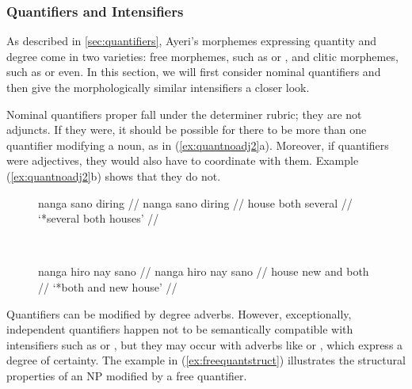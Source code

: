
\subsubsection{Quantifiers and Intensifiers}
\label{sec:quantsyn}

As described in \autoref{sec:quantifiers}, Ayeri's morphemes expressing
quantity and degree come in two varieties: free morphemes, such as
 or , and clitic
morphemes, such as  or 
{even}. In this section, we will first consider nominal quantifiers and then
give the morphologically similar intensifiers a closer look.

Nominal quantifiers proper fall under the determiner rubric; they are not
adjuncts. If they were, it should be possible for there to be more than one
quantifier modifying a noun, as in (\ref{ex:quantnoadj2}a). Moreover, if
quantifiers were adjectives, they would also have to coordinate with them.
Example (\ref{ex:quantnoadj2}b) shows that they do not.

\begin{figure}[h]
\ex{}\label{ex:quantnoadj2}
\begin{minipage}[t]{.5\remaining}
\tl\quad\label{ex:quantnoadj2_2}\ljudge*\begingl
	\gla nanga sano diring //
	\glb nanga sano diring //
	\glc house both several //
	\glft `*several both houses' //
\endgl
\end{minipage}
~
\begin{minipage}[t]{.5\remaining}
\tl\quad\label{ex:quantnoadj2_3}\ljudge*\begingl
	\gla nanga hiro nay sano //
	\glb nanga hiro nay sano //
	\glc house new and both //
	\glft `*both and new house' //
\endgl
\end{minipage}
\xe
\end{figure}

Quantifiers can be modified by degree adverbs. However, exceptionally,
independent quantifiers happen not to be semantically compatible with
intensifiers such as  or
, but they may occur with adverbs like
 or , which express a
degree of certainty. The example in (\ref{ex:freequantstruct}) illustrates the
structural properties of an NP modified by a free quantifier.

